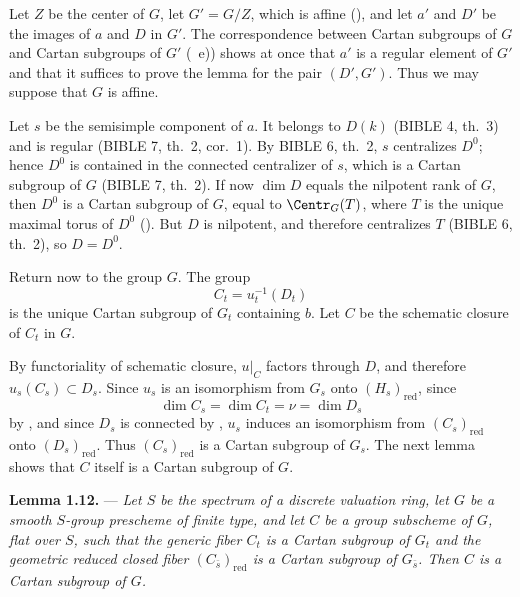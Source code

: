 Let \(Z\) be the center of \(G\), let \(G'=G/Z\), which is affine
(), and let \(a'\) and \(D'\) be the images of \(a\)
and \(D\) in \(G'\). The correspondence between Cartan subgroups of
\(G\) and Cartan subgroups of \(G'\) (~e)) shows at
once that \(a'\) is a regular element of \(G'\) and that it suffices
to prove the lemma for the pair \((D',G')\). Thus we may suppose that
\(G\) is affine.

Let \(s\) be the semisimple component of \(a\). It belongs to
\(D(k)\) (BIBLE 4, th.~3) and is regular (BIBLE 7, th.~2, cor.~1).
By BIBLE 6, th.~2, \(s\) centralizes \(D^0\); hence \(D^0\) is
contained in the connected centralizer of \(s\), which is a Cartan
subgroup of \(G\) (BIBLE 7, th.~2). If now
\(\dim D\) equals the nilpotent rank of \(G\), then \(D^0\) is a
Cartan subgroup of \(G\), equal to \(\Centr_G(T)\), where \(T\) is
the unique maximal torus of \(D^0\) (). But \(D\) is
nilpotent, and therefore centralizes \(T\) (BIBLE 6, th.~2), so
\(D=D^0\).

Return now to the group \(G\). The group
\[
  C_t=u_t^{-1}(D_t)
\]
is the unique Cartan subgroup of \(G_t\) containing \(b\). Let \(C\)
be the schematic closure of \(C_t\) in \(G\).

By functoriality of schematic closure, \(u|_C\) factors through
\(D\), and therefore \(u_s(C_s)\subset D_s\). Since \(u_s\) is an
isomorphism from \(G_s\) onto \((H_s)_{\mathrm{red}}\), since
\[
  \dim C_s=\dim C_t=\nu=\dim D_s
\]
by , and since \(D_s\) is connected by , \(u_s\) induces an
isomorphism from \((C_s)_{\mathrm{red}}\) onto
\((D_s)_{\mathrm{red}}\). Thus \((C_s)_{\mathrm{red}}\) is a Cartan
subgroup of \(G_s\). The next lemma shows that \(C\) itself is a
Cartan subgroup of \(G\).

\medskip
\noindent{}%
\textbf{Lemma 1.12.} --- \textit{Let \(S\) be the spectrum of a
discrete valuation ring, let \(G\) be a smooth \(S\)-group prescheme
of finite type, and let \(C\) be a group subscheme of \(G\), flat
over \(S\), such that the generic fiber \(C_t\) is a Cartan subgroup
of \(G_t\) and the geometric reduced closed fiber
\((C_{\bar s})_{\mathrm{red}}\) is a Cartan subgroup of
\(G_{\bar s}\). Then \(C\) is a Cartan subgroup of \(G\).}

